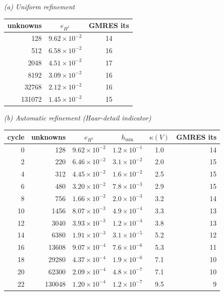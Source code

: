 \textit{(a) Uniform refinement}\\[2pt]
\begin{tabular}{rcc}
\toprule
unknowns & $e_{H^1}$ & GMRES its\\
\midrule
128 & $9.62{\times}10^{-2}$ & 14\\
512 & $6.58{\times}10^{-2}$ & 16\\
2048 & $4.51{\times}10^{-2}$ & 17\\
8192 & $3.09{\times}10^{-2}$ & 16\\
32768 & $2.12{\times}10^{-2}$ & 16\\
131072 & $1.45{\times}10^{-2}$ & 15\\
\bottomrule
\end{tabular}

\medskip
\textit{(b) Automatic refinement (Haar-detail indicator)}\\[2pt]
\begin{tabular}{rr ccc r}
\toprule
cycle & unknowns & $e_{H^1}$ & $h_{\min}$ & $\kappa(V)$ & GMRES its\\
\midrule
0 & 128 & $9.62{\times}10^{-2}$ & $1.2{\times}10^{-1}$ & 1.0 & 14\\
2 & 220 & $6.46{\times}10^{-2}$ & $3.1{\times}10^{-2}$ & 2.0 & 15\\
4 & 312 & $4.45{\times}10^{-2}$ & $1.6{\times}10^{-2}$ & 2.5 & 15\\
6 & 480 & $3.20{\times}10^{-2}$ & $7.8{\times}10^{-3}$ & 2.9 & 15\\
8 & 756 & $1.66{\times}10^{-2}$ & $2.0{\times}10^{-3}$ & 3.2 & 14\\
10 & 1456 & $8.07{\times}10^{-3}$ & $4.9{\times}10^{-4}$ & 3.3 & 13\\
12 & 3040 & $3.93{\times}10^{-3}$ & $1.2{\times}10^{-4}$ & 3.8 & 13\\
14 & 6380 & $1.91{\times}10^{-3}$ & $3.1{\times}10^{-5}$ & 5.2 & 12\\
16 & 13608 & $9.07{\times}10^{-4}$ & $7.6{\times}10^{-6}$ & 5.3 & 11\\
18 & 29280 & $4.37{\times}10^{-4}$ & $1.9{\times}10^{-6}$ & 7.1 & 10\\
20 & 62300 & $2.09{\times}10^{-4}$ & $4.8{\times}10^{-7}$ & 7.1 & 10\\
22 & 130048 & $1.20{\times}10^{-4}$ & $1.2{\times}10^{-7}$ & 9.5 & 9\\
\bottomrule
\end{tabular}
